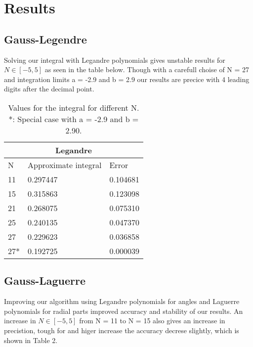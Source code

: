 \documentclass[../main.tex]{subfiles}
\begin{document}
\section{Results} \label{sec:results}
\subsection{Gauss-Legendre} \label{sec:QMProbresults}

Solving our integral with Legandre polynomials gives unstable results for $N \in [-5,5]$ as seen in the table below. Though with a carefull choise of N = 27 and integration limits a = -2.9 and b = 2.9 our results are precice with 4 leading digits after the decimal point.

\begin{table}[h!]
\begin{center}
  \begin{tabular}{ |p{1cm}|p{4cm}|p{3cm}|}
 \hline
 \multicolumn{3}{|c|}{Legandre} \\
 \hline
       N   &Approximate integral & Error\\
 \hline
 11 & 0.297447 & 0.104681\\
 15 & 0.315863 & 0.123098\\
 21 & 0.268075 & 0.075310\\
 25 & 0.240135 & 0.047370\\
 27 & 0.229623 & 0.036858\\
 27*& 0.192725 & 0.000039\\
 \hline
 \end{tabular}
 \caption{Values for the integral for different N. *: Special case with a = -2.9 and b = 2.90.}
 \end{center}
\end{table}

\subsection{Gauss-Laguerre} \label{sec:QMProbresults}
Improving our algorithm using Legandre polynomials for angles and Laguerre polynomials for radial parts improved accuracy and stability of our results. An increase in $N \in [-5,5]$ from N = 11 to N = 15 also gives an increase in precistion, tough for and higer increase the accuracy decrese slightly, which is shown in Table 2.
\end{document}
